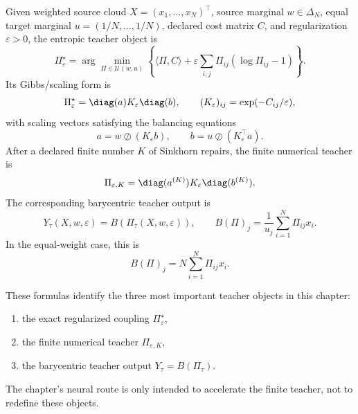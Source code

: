 Given weighted source cloud \(X=(x_1,\ldots,x_N)^\top\), source marginal
\(w\in\Delta_N\), equal target marginal
\(u=(1/N,\ldots,1/N)\), declared cost matrix \(C\), and regularization
\(\varepsilon>0\), the entropic teacher object is
\begin{equation}
\label{eq:bf-learned-ot-entropic-primal}
  \Pi_\varepsilon^\star
  =
  \arg\min_{\Pi\in\mathcal U(w,u)}
  \left\{
    \langle \Pi,C\rangle
    + \varepsilon\sum_{i,j}\Pi_{ij}(\log\Pi_{ij}-1)
  \right\}.
\end{equation}
Its Gibbs/scaling form is
\begin{equation}
\label{eq:bf-learned-ot-gibbs-factorization}
  \Pi_\varepsilon^\star
  =
  \diag(a)K_\varepsilon\diag(b),
  \qquad
  (K_\varepsilon)_{ij}=\exp(-C_{ij}/\varepsilon),
\end{equation}
with scaling vectors satisfying the balancing equations
\begin{equation}
\label{eq:bf-learned-ot-balancing}
  a = w \oslash (K_\varepsilon b),
  \qquad
  b = u \oslash (K_\varepsilon^\top a).
\end{equation}
After a declared finite number \(K\) of Sinkhorn repairs, the finite numerical
teacher is
\begin{equation}
\label{eq:bf-learned-ot-finite-teacher}
  \Pi_{\varepsilon,K}
  =
  \diag(a^{(K)})K_\varepsilon\diag(b^{(K)}).
\end{equation}
The corresponding barycentric teacher output is
\begin{equation}
\label{eq:bf-learned-ot-barycentric-teacher}
  Y_\tau(X,w,\varepsilon)
  =
  B(\Pi_\tau(X,w,\varepsilon)),
  \qquad
  B(\Pi)_j = \frac{1}{u_j}\sum_{i=1}^N \Pi_{ij}x_i.
\end{equation}
In the equal-weight case, this is
\begin{equation}
\label{eq:bf-learned-ot-barycentric-equal}
  B(\Pi)_j = N\sum_{i=1}^N \Pi_{ij}x_i.
\end{equation}

These formulas identify the three most important teacher objects in this chapter:
\begin{enumerate}[label=(\roman*)]
  \item the exact regularized coupling \(\Pi_\varepsilon^\star\),
  \item the finite numerical teacher \(\Pi_{\varepsilon,K}\),
  \item the barycentric teacher output \(Y_\tau=B(\Pi_\tau)\).
\end{enumerate}
The chapter's neural route is only intended to accelerate the finite teacher, not
to redefine these objects.

